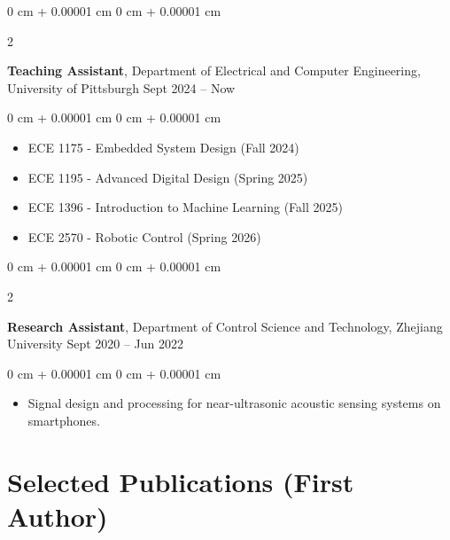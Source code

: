 \documentclass[10pt, letterpaper]{article}
\newenvironment{highlights}{
    \begin{itemize}[
        topsep=0.10 cm,
        parsep=0.10 cm,
        partopsep=0pt,
        itemsep=0pt,
        leftmargin=0 cm + 10pt
    ]
}{
    \end{itemize}
} %
\newenvironment{onecolentry}{
    \begin{adjustwidth}{
        0 cm + 0.00001 cm
    }{
        0 cm + 0.00001 cm
    }
}{
    \end{adjustwidth}
} %
\newenvironment{twocolentry}[2][]{
    \onecolentry
    \def\secondColumn{#2}
    \setcolumnwidth{\fill, 4.5 cm}
    \begin{paracol}{2}
}{
    \switchcolumn \raggedleft \secondColumn
    \end{paracol}
    \endonecolentry
} %
\begin{document}
        \vspace{0.2 cm}

        \begin{twocolentry}{
            Sept 2024 – Now
        }
            \textbf{Teaching Assistant}, Department of Electrical and Computer Engineering, University of Pittsburgh\end{twocolentry}

        \vspace{0.10 cm}
        \begin{onecolentry}
            \begin{highlights}
                \item ECE 1175 - Embedded System Design (Fall 2024)
                \item ECE 1195 - Advanced Digital Design (Spring 2025)
                \item ECE 1396 - Introduction to Machine Learning (Fall 2025)
                \item ECE 2570 - Robotic Control (Spring 2026)
                
            \end{highlights}
        \end{onecolentry}

        \vspace{0.2 cm}

        \begin{twocolentry}{
            Sept 2020 – Jun 2022
        }
            \textbf{Research Assistant}, Department of Control Science and Technology, Zhejiang University\end{twocolentry}

        \vspace{0.10 cm}
        \begin{onecolentry}
            \begin{highlights}
                \item Signal design and processing for near-ultrasonic acoustic sensing systems on smartphones.
            \end{highlights}
        \end{onecolentry}

    
    \section{Selected Publications (First Author)}
\end{document}
